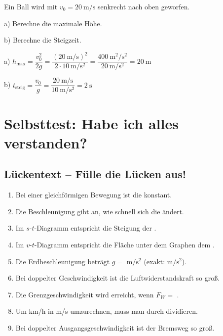 \documentclass[11pt, a4paper]{article}
\newcommand{\luecke}[1]{\underline{\hspace{#1}}}
\begin{document}
Ein Ball wird mit $v_0 = \SI{20}{\metre\per\second}$ senkrecht nach oben geworfen.

a) Berechne die maximale Höhe.

b) Berechne die Steigzeit.

\begin{tcolorbox}[colback=hellgrau, colframe=grau, boxrule=0.5pt, title=Lösung (Kopfrechnen mit $g \approx \SI{10}{\metre\per\second\squared}$)]
a) $h_{\text{max}} = \dfrac{v_0^2}{2g} = \dfrac{(\SI{20}{\metre\per\second})^2}{2 \cdot \SI{10}{\metre\per\second\squared}} = \dfrac{\SI{400}{\metre\squared\per\second\squared}}{\SI{20}{\metre\per\second\squared}} = \SI{20}{\metre}$

b) $t_{\text{steig}} = \dfrac{v_0}{g} = \dfrac{\SI{20}{\metre\per\second}}{\SI{10}{\metre\per\second\squared}} = \SI{2}{\second}$
\end{tcolorbox}

\newpage


\section{Selbsttest: Habe ich alles verstanden?}

\subsection{Lückentext -- Fülle die Lücken aus!}

\begin{enumerate}
    \item Bei einer gleichförmigen Bewegung ist die \luecke{3cm} konstant.

    \item Die Beschleunigung gibt an, wie schnell sich die \luecke{3cm} ändert.

    \item Im $s$-$t$-Diagramm entspricht die Steigung der \luecke{3cm}.

    \item Im $v$-$t$-Diagramm entspricht die Fläche unter dem Graphen dem \luecke{2cm}.

    \item Die Erdbeschleunigung beträgt $g = $ \luecke{1.5cm} $\si{\metre\per\second\squared}$ (exakt: \luecke{1.5cm} $\si{\metre\per\second\squared}$).

    \item Bei doppelter Geschwindigkeit ist die Luftwiderstandskraft \luecke{2cm} so groß.

    \item Die Grenzgeschwindigkeit wird erreicht, wenn $F_W = $ \luecke{2cm}.

    \item Um km/h in m/s umzurechnen, muss man durch \luecke{1.5cm} dividieren.

    \item Bei doppelter Ausgangsgeschwindigkeit ist der Bremsweg \luecke{2cm} so groß.
\end{enumerate}
\end{document}
